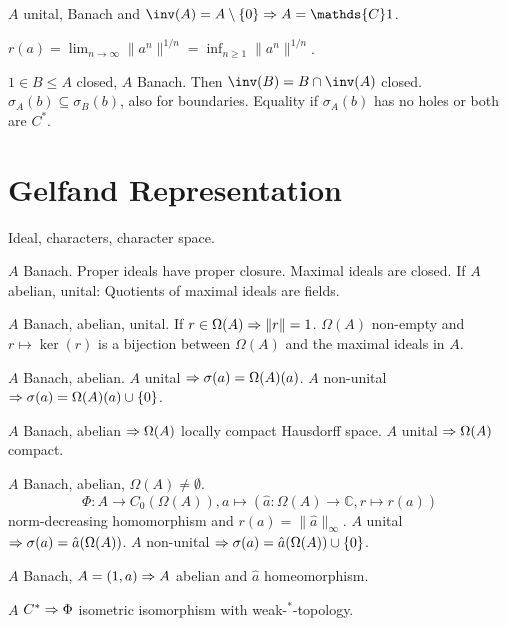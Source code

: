 \documentclass[a4paper, twocolumn, 10pt]{article}
\begin{document}
\begin{theorem}
    $A$ unital, Banach and $\inv(A) = A \setminus \{0\} \then A = \mathds{C}1$.
\end{theorem}

\begin{theorem}
    $r(a) = \lim_{n \to \infty} \|a^n\|^{1/n} = \inf_{n \geq 1} \|a^n\|^{1/n}$.
\end{theorem}

\begin{theorem}
    $1 \in B \leq A$ closed, $A$ Banach. Then $\inv(B) = B \cap \inv(A)$ closed. $\sigma_A(b) \subseteq \sigma_B(b)$, also for boundaries. Equality if $\sigma_A(b)$ has no holes or both are $C^*$.
\end{theorem}

\section{Gelfand Representation}

\begin{definition}
    Ideal, characters, character space.
\end{definition}

\begin{theorem}
    $A$ Banach.
    Proper ideals have proper closure.
    Maximal ideals are closed.
    If $A$ abelian, unital: Quotients of maximal ideals are fields.
\end{theorem}

\begin{theorem}
    $A$ Banach, abelian, unital. If $r \in \Omega(A) \Rightarrow \|r\| = 1$. $\Omega(A)$ non-empty and $r \mapsto \ker(r)$ is a bijection between $\Omega(A)$ and the maximal ideals in $A$.
\end{theorem}

\begin{theorem}
    $A$ Banach, abelian. $A$ unital $\Rightarrow \sigma(a) = \Omega(A)(a)$. $A$ non-unital $\Rightarrow \sigma(a) = \Omega(A)(a) \cup \{0\}$. 
\end{theorem}

\begin{theorem}
    $A$ Banach, abelian $\Rightarrow \Omega(A)$ locally compact Hausdorff space. $A$ unital $\Rightarrow \Omega(A)$ compact.
\end{theorem}

\begin{theorem}
    $A$ Banach, abelian, $\Omega(A) \neq \emptyset$.
    \begin{equation*}
        \Phi: A \to C_0(\Omega(A)), a \mapsto (\hat{a}: \Omega(A) \to \mathds{C}, r \mapsto r(a))
    \end{equation*}
    norm-decreasing homomorphism and $r(a) = \|\hat{a}\|_\infty$.
    $A$ unital $\Rightarrow \sigma(a) = \hat{a}(\Omega(A))$.
    $A$ non-unital $\Rightarrow \sigma(a) = \hat{a}(\Omega(A)) \cup \{0\}$.

    $A$ Banach, $A = (1,a) \Rightarrow A$ abelian and $\hat{a}$ homeomorphism.

    $A$ $C^* \Rightarrow \Phi$ isometric isomorphism with weak-$^*$-topology.
\end{theorem}
\end{document}
